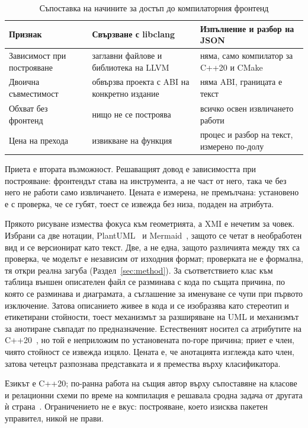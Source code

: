 \begin{table}[H]
\caption{Съпоставка на начините за достъп до компилаторния фронтенд}
\label{tab:frontend}
\centering
{}
\fontsize{10}{11}\selectfont
\begin{tabular}{@{}L{3.2cm}L{4.3cm}L{4.3cm}@{}}
\toprule
\textbf{Признак} & \textbf{Свързване с libclang} & \textbf{Изпълнение и разбор на JSON} \\
\midrule
Зависимост при построяване & заглавни файлове и библиотека на LLVM & няма, само компилатор за C++20 и CMake \\
Двоична съвместимост & обвързва проекта с ABI на конкретно издание & няма ABI, границата е текст \\
Обхват без фронтенд & нищо не се построява & всичко освен извличането работи \\
Цена на прехода & извикване на функция & процес и разбор на текст, измерено по-долу \\
\bottomrule
\end{tabular}
\end{table}

Приета е втората възможност. Решаващият довод е зависимостта при построяване: фронтендът става
 на инструмента, а не част от него, така че без него не работи само извличането. Цената е
измерена, не премълчана: установено е с проверка, че  се губят, тоест
 се извежда без низа, подаден на атрибута.

Прякото рисуване измества фокуса към геометрията, а XMI е нечетим за човек. Избрани са две нотации, PlantUML~\cite{plantuml_guide} и Mermaid~\cite{mermaid_docs},
защото се четат в необработен вид и се версионират като текст. Две, а не една, защото различията между
тях са проверка, че моделът е независим от изходния формат; проверката не е формална, тя откри реална
загуба (Раздел~\ref{sec:method}). За съответствието клас към таблица външен описателен файл се
разминава с кода по същата причина, по която се разминава и диаграмата, а съглашение за именуване се
чупи при първото изключение. Затова описанието живее в кода и се изобразява като стереотип и
етикетирани стойности, тоест механизмът за разширяване на UML и механизмът за анотиране съвпадат по
предназначение. Естественият носител са атрибутите на C++20~\cite{iso_cpp20}, но той е неприложим по
установената по-горе причина; приет е  член, чиято стойност се извежда изцяло.
Цената е, че анотацията изглежда като член, затова четецът разпознава представката  и я
премества върху класификатора.

Езикът е C++20; по-ранна работа на същия автор върху съпоставяне на класове и релационни схеми по
време на компилация е решавала сродна задача от другата ѝ страна~\cite{tsvetanov_bsc_orm}.
Ограничението  не е вкус: построяване, което изисква
пакетен управител, никой не прави.
